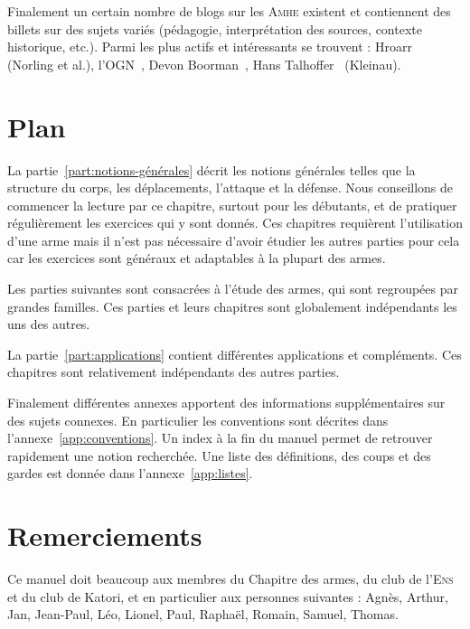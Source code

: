 Finalement un certain nombre de blogs sur les \textsc{Amhe} existent et contiennent des billets sur des sujets variés (pédagogie, interprétation des sources, contexte historique, etc.).
Parmi les plus actifs et intéressants se trouvent : Hroarr~\cite{Blog:Hroarr} (Norling et al.), l'OGN~\cite{Blog:OGN}, Devon Boorman~\cite{Blog:Boorman}, Hans Talhoffer~\cite{Blog:HansTalhoffer} (Kleinau).


\section{Plan}


La partie~\ref{part:notions-générales} décrit les notions générales telles que la structure du corps, les déplacements, l'attaque et la défense.
Nous conseillons de commencer la lecture par ce chapitre, surtout pour les débutants, et de pratiquer régulièrement les exercices qui y sont donnés.
Ces chapitres requièrent l'utilisation d'une arme mais il n'est pas nécessaire d'avoir étudier les autres parties pour cela car les exercices sont généraux et adaptables à la plupart des armes.

Les parties suivantes sont consacrées à l'étude des armes, qui sont regroupées par grandes familles.
Ces parties et leurs chapitres sont globalement indépendants les uns des autres.

La partie~\ref{part:applications} contient différentes applications et compléments.
Ces chapitres sont relativement indépendants des autres parties.

Finalement différentes annexes apportent des informations supplémentaires sur des sujets connexes.
En particulier les conventions sont décrites dans l'annexe~\ref{app:conventions}.
Un index à la fin du manuel permet de retrouver rapidement une notion recherchée.
Une liste des définitions, des coups et des gardes est donnée dans l'annexe~\ref{app:listes}.


\section{Remerciements}


Ce manuel doit beaucoup aux membres du Chapitre des armes, du club de l'\textsc{Ens} et du club de Katori, et en particulier aux personnes suivantes : Agnès, Arthur, Jan, Jean-Paul, Léo, Lionel, Paul, Raphaël, Romain, Samuel, Thomas.
